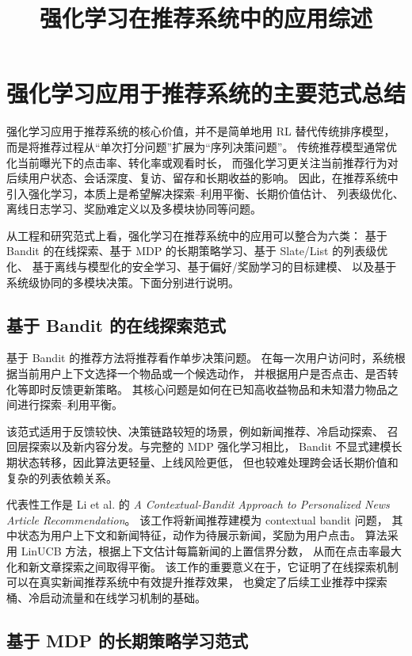 \documentclass[11pt]{ctexart}
\title{强化学习在推荐系统中的应用综述}
\author{}
\date{}
\begin{document}
\maketitle
\section{强化学习应用于推荐系统的主要范式总结}

强化学习应用于推荐系统的核心价值，并不是简单地用 RL 替代传统排序模型，
而是将推荐过程从``单次打分问题''扩展为``序列决策问题''。
传统推荐模型通常优化当前曝光下的点击率、转化率或观看时长，
而强化学习更关注当前推荐行为对后续用户状态、会话深度、复访、留存和长期收益的影响。
因此，在推荐系统中引入强化学习，本质上是希望解决探索--利用平衡、长期价值估计、
列表级优化、离线日志学习、奖励难定义以及多模块协同等问题。

从工程和研究范式上看，强化学习在推荐系统中的应用可以整合为六类：
基于 Bandit 的在线探索、基于 MDP 的长期策略学习、基于 Slate/List 的列表级优化、
基于离线与模型化的安全学习、基于偏好/奖励学习的目标建模、
以及基于系统级协同的多模块决策。下面分别进行说明。

\subsection{基于 Bandit 的在线探索范式}

基于 Bandit 的推荐方法将推荐看作单步决策问题。
在每一次用户访问时，系统根据当前用户上下文选择一个物品或一个候选动作，
并根据用户是否点击、是否转化等即时反馈更新策略。
其核心问题是如何在已知高收益物品和未知潜力物品之间进行探索--利用平衡。

该范式适用于反馈较快、决策链路较短的场景，例如新闻推荐、冷启动探索、
召回层探索以及新内容分发。与完整的 MDP 强化学习相比，
Bandit 不显式建模长期状态转移，因此算法更轻量、上线风险更低，
但也较难处理跨会话长期价值和复杂的列表依赖关系。

代表性工作是 Li et al. 的
\textit{A Contextual-Bandit Approach to Personalized News Article Recommendation}。
该工作将新闻推荐建模为 contextual bandit 问题，
其中状态为用户上下文和新闻特征，动作为待展示新闻，奖励为用户点击。
算法采用 LinUCB 方法，根据上下文估计每篇新闻的上置信界分数，
从而在点击率最大化和新文章探索之间取得平衡。
该工作的重要意义在于，它证明了在线探索机制可以在真实新闻推荐系统中有效提升推荐效果，
也奠定了后续工业推荐中探索桶、冷启动流量和在线学习机制的基础。

\subsection{基于 MDP 的长期策略学习范式}
\end{document}
